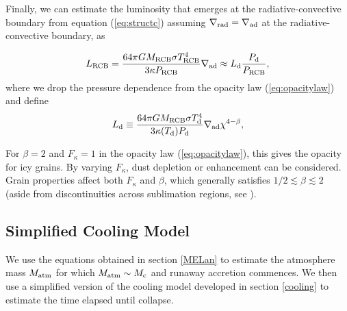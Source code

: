 \documentclass[apj]{emulateapj}
\newcommand{\delad}{\nabla_{\rm ad}}
\newcommand{\delrad}{\nabla_{\rm rad}}
\newcommand{\co}{_{\rm c}}
\newcommand{\di}{_{\rm d}}
\newcommand{\cb}{_{\rm RCB}}
\begin{document}
Finally, we can estimate the luminosity that emerges at the radiative-convective boundary from equation (\ref{eq:structc}) assuming $\delrad=\delad$ at the radiative-convective boundary, as

\begin{equation} \label{eq:Lcb}
L\cb = {64 \pi G M\cb \sigma T\cb^4 \over 3 \kappa P\cb } \nabla_{\rm ad} \approx L\di {P_{\rm d} \over P\cb}, %
\end{equation} 
where we drop the pressure dependence from the opacity law (\ref{eq:opacitylaw}) and define 
\begin{equation} 
L\di \equiv {64 \pi G M\cb \sigma T_{\rm d}^4 \over 3 \kappa(T_{\rm d}) P_{\rm d}} \nabla_{\rm ad}\chi^{4-\beta}, 
\end{equation} 

 For $\beta = 2$ and $F_\kappa = 1$ in the opacity law (\ref{eq:opacitylaw}), this gives the \citet{bell94} opacity for icy grains.  By varying $F_\kappa$, dust depletion or enhancement can be considered.  Grain properties affect both $F_\kappa$ and $\beta$, which generally satisfies  $1/2 \lesssim \beta \lesssim 2$ (aside from discontinuities across sublimation regions, see \citealt{semenov03}).







\subsection{Simplified Cooling Model}
\label{coolingan}

We use the equations obtained in section \ref{MELan} to estimate the atmosphere mass $M_{\rm{atm}}$ for which $M_{\rm{atm}} \sim M\co$ and runaway accretion commences. We then use a simplified version of the cooling model developed in section \ref{cooling} to estimate the time elapsed until collapse. 
\end{document}

